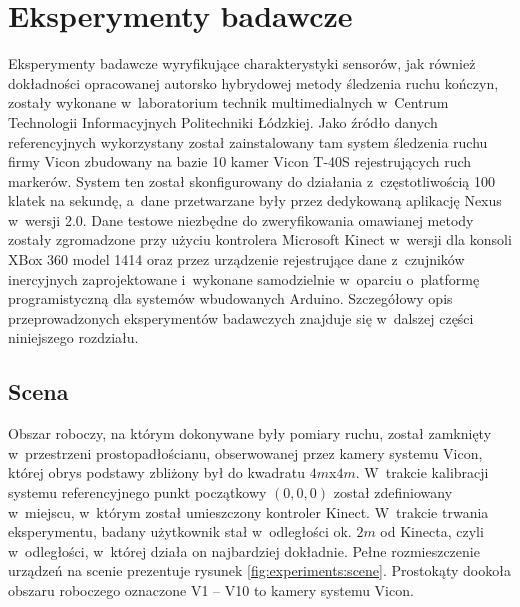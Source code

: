 \chapter{Eksperymenty badawcze}\label{chap:experiments}
Eksperymenty badawcze wyryfikujące charakterystyki sensorów, jak również dokładności opracowanej autorsko hybrydowej metody śledzenia ruchu kończyn, zostały wykonane w~laboratorium technik multimedialnych w~Centrum Technologii Informacyjnych Politechniki Łódzkiej. Jako źródło danych referencyjnych wykorzystany został zainstalowany tam system śledzenia ruchu firmy Vicon zbudowany na bazie 10 kamer Vicon T-40S  rejestrujących ruch markerów. System ten został skonfigurowany do działania z~częstotliwością 100 klatek na sekundę, a~dane przetwarzane były przez dedykowaną aplikację Nexus w~wersji 2.0. Dane testowe niezbędne do zweryfikowania omawianej metody zostały zgromadzone przy użyciu kontrolera Microsoft Kinect w~wersji dla konsoli XBox 360 model 1414 oraz przez urządzenie rejestrujące dane z~czujników inercyjnych zaprojektowane i~wykonane samodzielnie w~oparciu o~platformę programistyczną dla systemów wbudowanych Arduino. Szczegółowy opis przeprowadzonych eksperymentów badawczych znajduje się w~dalszej części niniejszego rozdziału.

\section{Scena}
Obszar roboczy, na którym dokonywane były pomiary ruchu, został zamknięty w~przestrzeni prostopadłościanu, obserwowanej przez kamery systemu Vicon, której obrys podstawy zbliżony był do kwadratu $4m$x$4m$. W~trakcie kalibracji systemu referencyjnego punkt początkowy $\left(0, 0, 0\right)$ został zdefiniowany w~miejscu, w~którym został umieszczony kontroler Kinect. W~trakcie trwania eksperymentu, badany użytkownik stał w~odległości ok. $2m$ od Kinecta, czyli w~odległości, w~której działa on najbardziej dokładnie.  Pełne rozmieszczenie urządzeń na scenie prezentuje rysunek \ref{fig:experiments:scene}. Prostokąty dookoła obszaru roboczego oznaczone V1 -- V10 to kamery systemu Vicon.

